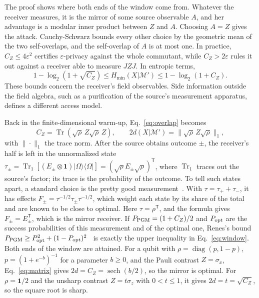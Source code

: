 \documentclass[11pt,a4paper]{article}
\providecommand{\openone}{\mathbf{1}}
\newcommand{\M}{\mathcal M}
\newcommand{\id}{\openone}
\begin{document}
The proof shows where both ends of the window come from. Whatever the receiver measures, it is the mirror of some source observable $A$, and her advantage is a modular inner product between $Z$ and $A$. Choosing $A=Z$ gives the attack. Cauchy-Schwarz bounds every other choice by the geometric mean of the two self-overlaps, and the self-overlap of $A$ is at most one. In practice, $C_Z\le4\varepsilon^2$ certifies $\varepsilon$-privacy against the whole commutant, while $C_Z>2\varepsilon$ rules it out against a receiver able to measure $JZJ$. In entropic terms,
\begin{equation}
 1-\log_2(1+\sqrt{C_Z})\le H_{\min}(X|\M')
 \le1-\log_2(1+C_Z).
 \label{eq:entropywindow}
\end{equation}
These bounds concern the receiver's field observables. Side information outside the field algebra, such as a purification of the source's measurement apparatus, defines a different access model.

Back in the finite-dimensional warm-up, Eq.~\eqref{eq:overlap} becomes
\begin{equation}
 C_Z=\operatorname{Tr}(\sqrt\rho\,Z\sqrt\rho\,Z),\qquad
 2d(X|\M')=\|\sqrt\rho\,Z\sqrt\rho\|_1,
 \label{eq:matrix}
\end{equation}
with $\|\cdot\|_1$ the trace norm. After the source obtains outcome $\pm$, the receiver's half is left in the unnormalized state $\tau_\pm=\operatorname{Tr}_1[(E_\pm\otimes\id)|\Omega\rangle\langle\Omega|]=(\sqrt\rho E_\pm\sqrt\rho)^{\mathsf T}$, where $\operatorname{Tr}_1$ traces out the source's factor; its trace is the probability of the outcome. To tell such states apart, a standard choice is the pretty good measurement~\cite{hausladen1994pretty,barnum2002reversing}. With $\tau=\tau_++\tau_-$, it has effects $F_\pm=\tau^{-1/2}\tau_\pm\tau^{-1/2}$, which weight each state by its share of the total and are known to be close to optimal. Here $\tau=\rho^{\mathsf T}$, and the formula gives $F_\pm=E_\pm^{\mathsf T}$, which is the mirror receiver. If $P_{\rm PGM}=(1+C_Z)/2$ and $P_{\rm opt}$ are the success probabilities of this measurement and of the optimal one, Renes's bound $P_{\rm PGM}\ge P_{\rm opt}^2+(1-P_{\rm opt})^2$~\cite{renes2017better} is exactly the upper inequality in Eq.~\eqref{eq:window}. Both ends of the window are attained. For a qubit with $\rho=\operatorname{diag}(p,1-p)$, $p=(1+e^{-b})^{-1}$ for a parameter $b\ge0$, and the Pauli contrast $Z=\sigma_x$, Eq.~\eqref{eq:matrix} gives $2d=C_Z=\operatorname{sech}(b/2)$, so the mirror is optimal. For $\rho=\id/2$ and the unsharp contrast $Z=t\sigma_z$ with $0<t\le1$, it gives $2d=t=\sqrt{C_Z}$, so the square root is sharp.
\end{document}
